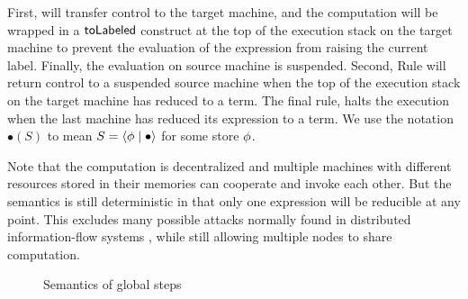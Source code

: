 First,  will transfer control to the target machine, and the computation will be wrapped in a $\mathsf{toLabeled}$ construct at the top of the execution stack on the target machine to prevent the evaluation of the expression from raising the current label. Finally, the evaluation on source machine is suspended. Second, Rule  will return control to a suspended source machine when the top of the execution stack on the target machine has reduced to a term. The final rule,  halts the execution when the last machine has reduced its expression to a term. We use the notation $\bullet(S)$ to mean $S = \langle \phi \mid \bullet \rangle$ for some store $\phi$.

Note that the computation is decentralized and multiple machines with different resources stored in their memories can cooperate and invoke each other. But the semantics is still deterministic in that only one expression will be reducible at any point. This excludes many possible attacks normally found in distributed information-flow systems \cite{Is this claim too bold?}, while still allowing multiple nodes to share computation.

\begin{figure*}
\centering
{}
\caption{Semantics of global steps}
\label{fig:global-steps}
\end{figure*}

